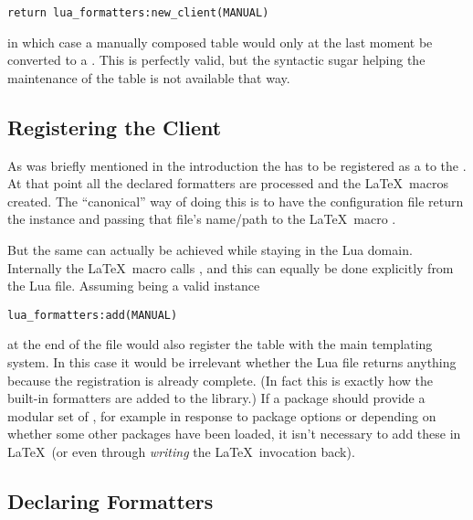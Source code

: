 \documentclass[12pt]{scrartcl}
\begin{document}
\begin{verbatim}
return lua_formatters:new_client(MANUAL)
\end{verbatim}

\noindent in which case a manually composed table  would only at
the last moment be converted to a .  This is perfectly
valid, but the syntactic sugar helping the maintenance of the table is not
available that way.


\subsection{Registering the Client}
\label{sec:usage-registering-the-client}

As was briefly mentioned in the introduction the  has to be
registered as a  to the .  At that point
all the declared formatters are processed and the \LaTeX\ macros created.  The
“canonical” way of doing this is to have the configuration file return the
 instance and passing that file's name/path  to the
\LaTeX\ macro \texttt{}.

But the same can actually be achieved while staying in the Lua domain.
Internally the \LaTeX\ macro calls , and this can
equally be done explicitly from the Lua file.  Assuming  being a
valid  instance

\begin{verbatim}
lua_formatters:add(MANUAL)
\end{verbatim}

\noindent at the end of the file would also register the  table
with the main templating system.  In this case it would be irrelevant whether
the Lua file returns anything because the registration is already complete.  (In
fact this is exactly how the built-in formatters are added to the library.) If a
package should provide a modular set of ,
for example in response to package options or depending on whether some other
packages have been loaded, it isn't necessary to add these in \LaTeX\ (or even
through \emph{writing} the \LaTeX\ invocation back).


\subsection{Declaring Formatters}
\label{sec:usage:declaring-formatters}
\end{document}
